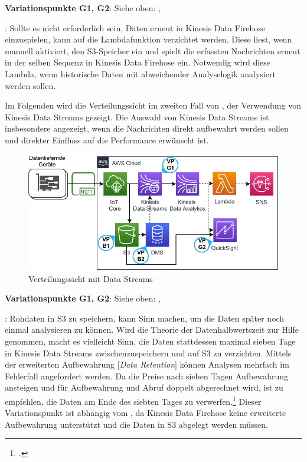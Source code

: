 \textbf{Variationspunkte G1, G2}: Siehe oben: , 

: Sollte es nicht erforderlich sein, Daten erneut in Kinesis Data Firehose einzuspielen, kann auf die Lambdafunktion verzichtet werden. Diese liest, wenn manuell aktiviert, den \ac{S3}-Speicher ein und spielt die erfassten Nachrichten erneut in der selben Sequenz in Kinesis Data Firehose ein. Notwendig wird diese Lambda, wenn historische Daten mit abweichender Analyselogik analysiert werden sollen.

Im Folgenden wird die Verteilungssicht im zweiten Fall von , der Verwendung von Kinesis Data Streams gezeigt. Die Auswahl von Kinesis Data Streams ist insbesondere angezeigt, wenn die Nachrichten direkt aufbewahrt werden sollen und direkter Einfluss auf die Performance erwünscht ist.

\begin{figure}[H]
\centering
\includegraphics[width=\textwidth]{graphics/Echtzeit-RA-Overview.pdf}
\caption{Verteilungssicht mit Data Streams}
\label{abb:TopLevelEchtzeitRAStreams}
\end{figure}

\textbf{Variationspunkte G1, G2}: Siehe oben: , 

: Rohdaten in \ac{S3} zu speichern, kann Sinn machen, um die Daten später noch einmal analysieren zu können. Wird  die Theorie der Datenhalbwertszeit zur Hilfe genommen, macht es vielleicht Sinn, die Daten stattdessen maximal sieben 
Tage in Kinesis Data Streams zwischenzuspeichern und auf \ac{S3} zu verzichten. Mittels der erweiterten Aufbewahrung $\lbrack$\textit{Data Retention}$\rbrack$ können Analysen mehrfach im Fehlerfall angefordert werden. Da die Preise nach sieben Tagen Aufbewahrung ansteigen und für Aufbewahrung und Abruf doppelt abgerechnet wird, ist zu empfehlen, die Daten am Ende des siebten Tages zu verwerfen.\footcite[Vgl.][]{AmazonWebServicesInc..o.J.l} Dieser Variationspunkt ist abhängig vom , da Kinesis Data Firehose keine erweiterte Aufbewahrung unterstützt und die Daten in \ac{S3} abgelegt werden müssen.

